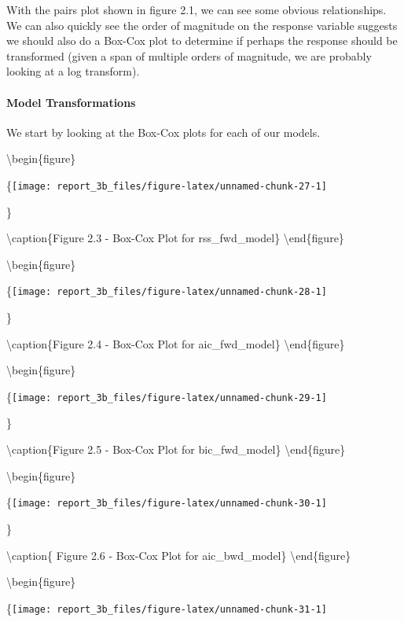 \documentclass[
]{article}
\begin{document}
With the pairs plot shown in figure 2.1, we can see some obvious
relationships. We can also quickly see the order of magnitude on the
response variable suggests we should also do a Box-Cox plot to determine
if perhaps the response should be transformed (given a span of multiple
orders of magnitude, we are probably looking at a log transform).

\hypertarget{model-transformations}{%
\paragraph{Model Transformations}\label{model-transformations}}

We start by looking at the Box-Cox plots for each of our models.

\textbackslash begin\{figure\}

\{\centering \texttt{[image: report\_3b\_files/figure-latex/unnamed-chunk-27-1]}

\}

\textbackslash caption\{Figure 2.3 - Box-Cox Plot for
rss\_fwd\_model\}\label{fig:unnamed-chunk-27}
\textbackslash end\{figure\}

\textbackslash begin\{figure\}

\{\centering \texttt{[image: report\_3b\_files/figure-latex/unnamed-chunk-28-1]}

\}

\textbackslash caption\{Figure 2.4 - Box-Cox Plot for
aic\_fwd\_model\}\label{fig:unnamed-chunk-28}
\textbackslash end\{figure\}

\textbackslash begin\{figure\}

\{\centering \texttt{[image: report\_3b\_files/figure-latex/unnamed-chunk-29-1]}

\}

\textbackslash caption\{Figure 2.5 - Box-Cox Plot for
bic\_fwd\_model\}\label{fig:unnamed-chunk-29}
\textbackslash end\{figure\}

\textbackslash begin\{figure\}

\{\centering \texttt{[image: report\_3b\_files/figure-latex/unnamed-chunk-30-1]}

\}

\textbackslash caption\{ Figure 2.6 - Box-Cox Plot for
aic\_bwd\_model\}\label{fig:unnamed-chunk-30}
\textbackslash end\{figure\}

\textbackslash begin\{figure\}

\{\centering \texttt{[image: report\_3b\_files/figure-latex/unnamed-chunk-31-1]}
\end{document}
